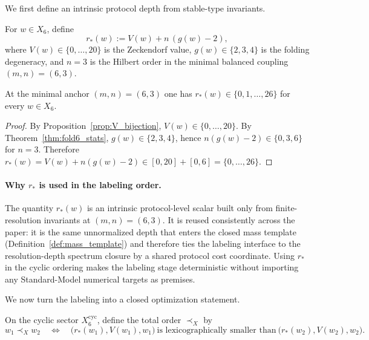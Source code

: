 We first define an intrinsic protocol depth from stable-type invariants.
\begin{definition}[Effective protocol depth at $(m,n)=(6,3)$]\label{def:r_star}
For $w\in X_6$, define
\begin{equation}\label{eq:r_star_def}
r_\ast(w):=V(w)+n\,(g(w)-2),
\end{equation}
where $V(w)\in\{0,\dots,20\}$ is the Zeckendorf value, $g(w)\in\{2,3,4\}$ is the folding degeneracy, and $n=3$ is the Hilbert order in the minimal balanced coupling $(m,n)=(6,3)$.
\end{definition}

\begin{lemma}[Discrete range of $r_\ast$ at $(m,n)=(6,3)$]\label{lem:rstar_range}
At the minimal anchor $(m,n)=(6,3)$ one has $r_\ast(w)\in\{0,1,\dots,26\}$ for every $w\in X_6$.
\end{lemma}
\begin{proof}
By Proposition~\ref{prop:V_bijection}, $V(w)\in\{0,\dots,20\}$.
By Theorem~\ref{thm:fold6_stats}, $g(w)\in\{2,3,4\}$, hence $n(g(w)-2)\in\{0,3,6\}$ for $n=3$.
Therefore $r_\ast(w)=V(w)+n(g(w)-2)\in[0,20]+[0,6]=\{0,\dots,26\}$.
\end{proof}

\paragraph{Why $r_\ast$ is used in the labeling order.}
The quantity $r_\ast(w)$ is an intrinsic protocol-level scalar built only from finite-resolution invariants at $(m,n)=(6,3)$.
It is reused consistently across the paper: it is the same unnormalized depth that enters the closed mass template (Definition~\ref{def:mass_template}) and therefore ties the labeling interface to the resolution-depth spectrum closure by a shared protocol cost coordinate.
Using $r_\ast$ in the cyclic ordering makes the labeling stage deterministic without importing any Standard-Model numerical targets as premises.

We now turn the labeling into a closed optimization statement.

\begin{definition}\label{def:order_x6}
On the cyclic sector $X_6^{\mathrm{cyc}}$, define the total order $\prec_X$ by
\[
w_1\prec_X w_2
\quad\Longleftrightarrow\quad
\bigl(r_\ast(w_1),V(w_1),w_1\bigr)\ \text{is lexicographically smaller than}\ \bigl(r_\ast(w_2),V(w_2),w_2\bigr).
\]
\end{definition}

